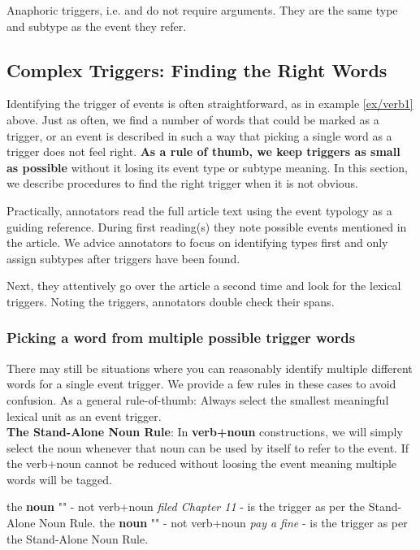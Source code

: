 Anaphoric triggers, i.e.  and  do not require arguments.
They are the same type and subtype as the event they refer.


\subsection{Complex Triggers: Finding the Right Words}

Identifying the trigger of events is often straightforward, as in example \ref{ex/verb1} above.
Just as often, we find a number of words that could be marked as a trigger, or an event is described in such a way that picking a single word as a trigger does not feel right.
\textbf{As a rule of thumb, we keep triggers as small as possible} without it losing its event type or subtype meaning.
In this section, we describe procedures to find the right trigger when it is not obvious.

Practically, annotators read the full article text using the event typology as a guiding reference.
During first reading(s) they note possible events mentioned in the article.
We advice annotators to focus on identifying types first and only assign subtypes after triggers have been found.

Next, they attentively go over the article a second time and look for the lexical triggers.
Noting the triggers, annotators double check their spans.


\subsubsection{Picking a word from multiple possible trigger words}

There may still be situations where you can reasonably identify multiple different words for a single event trigger. We provide a few rules in these cases to avoid confusion. As a general rule-of-thumb: Always select the smallest meaningful lexical unit as an event trigger.
\\[10pt]
\noindent\textbf{The Stand-Alone Noun Rule}:
In \textbf{verb+noun} constructions, we will simply select the noun whenever that noun can be used by itself to refer to the event.
If the verb+noun cannot be reduced without loosing the event meaning multiple words will be tagged.

\begin{exe}
    \ex {}
        \expl the \textbf{noun} "" - not verb+noun \textit{filed Chapter 11} - is the trigger as per the Stand-Alone Noun Rule.
    \ex {}
        \expl the \textbf{noun} "" - not verb+noun \textit{pay a fine} - is the trigger as per the Stand-Alone Noun Rule.
\end{exe}

